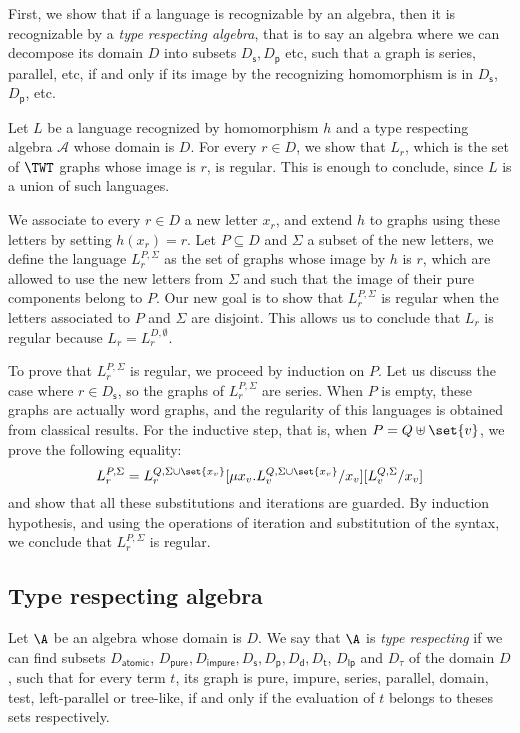 First, we show that if a language is recognizable by an algebra, then it is recognizable by a \emph{type respecting algebra}, that is to say an algebra where we can decompose its domain $D$ into subsets  $D_\mathsf{s}, D_\mathsf{p}$ etc, such that a graph is series,  parallel, etc, if and only if its image by the recognizing homomorphism is in $D_\mathsf{s}$, $D_\mathsf{p}$, etc. 

Let $L$ be a language recognized by homomorphism $h$ and a type respecting algebra $\mathcal{A}$ whose domain is $D$.  For every  $r\in D$,  we show that $L_r$, which is the set of $\TWT$ graphs whose image is $r$, is regular. This is enough to conclude, since $L$ is a union of such languages. 

We associate to every $r\in D$ a new letter $x_r$, and extend $h$ to graphs using these letters by setting $h(x_r)=r$. Let $P\subseteq D$  and $\Sigma$ a subset of the new letters,  we define the language $L^{P,\Sigma}_r$ as the set of graphs whose image by $h$ is $r$, which are allowed to use the new letters from $\Sigma$ and such that the image of their pure components belong to $P$. Our new goal is to show that $L^{P,\Sigma}_r$ is regular when the letters associated to $P$ and $\Sigma$ are disjoint. This allows us to conclude that $L_r$ is regular because $L_r=L^{D,\emptyset}_r$.    

To prove that $L^{P,\Sigma}_r$ is regular, we proceed by induction on $P$. Let us discuss the case where $r\in D_\mathsf{s}$, so the graphs of $L^{P,\Sigma}_r$ are series.  When $P$ is empty, these graphs are actually word graphs, and the regularity of this languages is obtained from classical results. For the inductive step, that is, when $P=Q\uplus \set{v}$, we prove the following equality:
$$L^{P,\Sigma}_r=L^{Q,\Sigma\cup\set{x_v}}_r[\mu x_v. L^{Q,\Sigma\cup\set{x_v}}_v/x_v][L^{Q,\Sigma}_v/x_v]  $$
and show that all these substitutions and iterations are guarded. By induction hypothesis, and using the operations of iteration and substitution of the syntax, we conclude that $L^{P,\Sigma}_r$ is regular. 

\subsection{Type respecting algebra}

\begin{definition}
Let  $\A$ be an algebra whose domain is $D$. We say that $\A$ is \emph{type respecting} if we can find subsets $D_\mathsf{atomic}$, $D_\mathsf{pure}, D_\mathsf{impure}, D_\mathsf{s}, D_\mathsf{p}, D_\mathsf{d}, D_\mathsf{t}$, $D_\mathsf{lp}$ and $D_\mathsf{\tau}$ of the domain $D$, such that for every term $t$, its graph is pure, impure,  series, parallel, domain, test, left-parallel or tree-like, if and only if the evaluation of $t$ belongs to theses sets respectively.  
\end{definition}

